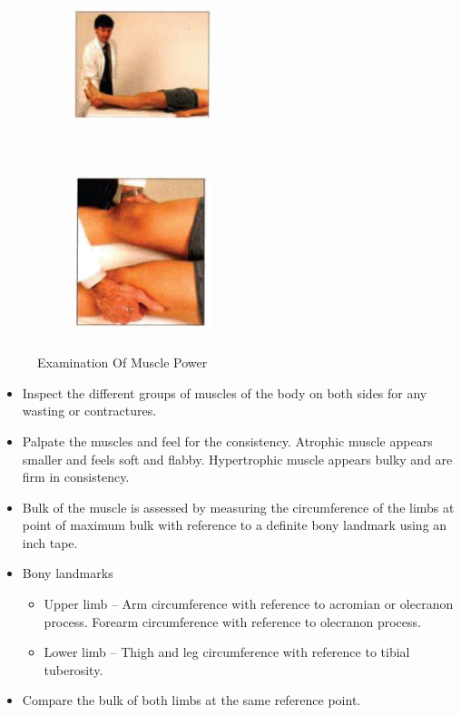 \documentclass[a4paper,12pt,openany,oneside]{book}
\begin{document}
{\begin{figure}[H]
\begin{subfigure}[t]{.25\textwidth}
		\end{subfigure}
		\hspace{\fill}
		\begin{subfigure}[t]{.25\textwidth}
			\includegraphics[width=4cm,height=5cm]{./clinicalPhysioPic/motorSystem/hipExtension.jpg}
		\end{subfigure}
		\hspace{\fill}
		\begin{subfigure}[t]{.25\textwidth}
			\includegraphics[width=4cm,height=5cm]{./clinicalPhysioPic/motorSystem/hipAbduction.jpg}
		\end{subfigure}
		\caption*{Examination Of Muscle Power}
	\end{figure}
}
\begin{itemize}
\item{Inspect the different groups of muscles of the body on both sides for any wasting or contractures.}
\item{Palpate the muscles and feel for the consistency. Atrophic muscle appears smaller and feels soft and flabby. Hypertrophic muscle appears bulky and are firm in consistency.}
\item{Bulk of the muscle is assessed by measuring the circumference of the limbs at point of maximum bulk with reference to a definite bony landmark using an inch tape.}
\item{Bony landmarks}
	\begin{itemize}
		\item[]Upper limb 	–	Arm circumference with reference to acromian or olecranon 			process. Forearm circumference with reference to olecranon 			process.
		\item[]Lower limb 	–	Thigh and leg circumference with reference to tibial 				tuberosity. 
	\end{itemize}
\item{ Compare the bulk of both limbs at the same reference point.}
\end{itemize}
\end{document}
